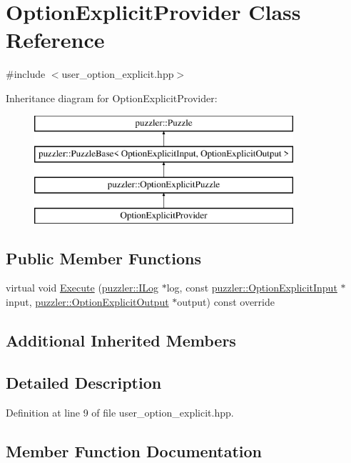 \hypertarget{a00021}{}\section{Option\+Explicit\+Provider Class Reference}
\label{a00021}


{\ttfamily \#include $<$user\+\_\+option\+\_\+explicit.\+hpp$>$}

Inheritance diagram for Option\+Explicit\+Provider\+:\begin{figure}[H]
\begin{center}
\leavevmode
\includegraphics[height=4.000000cm]{a00021}
\end{center}
\end{figure}
\subsection*{Public Member Functions}
\begin{DoxyCompactItemize}
\item 
virtual void \hyperlink{a00021_a5cf3e8ddb0fb8da75801e19420b4a589}{Execute} (\hyperlink{a00008}{puzzler\+::\+I\+Log} $\ast$log, const \hyperlink{a00019}{puzzler\+::\+Option\+Explicit\+Input} $\ast$input, \hyperlink{a00020}{puzzler\+::\+Option\+Explicit\+Output} $\ast$output) const override
\end{DoxyCompactItemize}
\subsection*{Additional Inherited Members}


\subsection{Detailed Description}


Definition at line 9 of file user\+\_\+option\+\_\+explicit.\+hpp.



\subsection{Member Function Documentation}
\hypertarget{a00021_a5cf3e8ddb0fb8da75801e19420b4a589}{}
